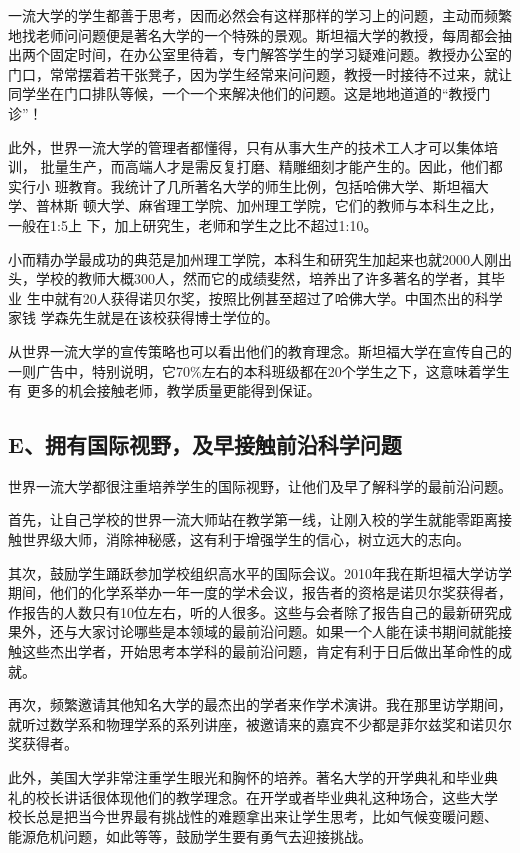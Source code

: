 \documentclass[11pt]{ctexart}
\begin{document}
{{{{一流大学的学生都善于思考，因而必然会有这样那样的学习上的问题，主动而频繁
地找老师问问题便是著名大学的一个特殊的景观。斯坦福大学的教授，每周都会抽
出两个固定时间，在办公室里待着，专门解答学生的学习疑难问题。教授办公室的
门口，常常摆着若干张凳子，因为学生经常来问问题，教授一时接待不过来，就让
同学坐在门口排队等候，一个一个来解决他们的问题。这是地地道道的“教授门
诊”！


此外，世界一流大学的管理者都懂得，只有从事大生产的技术工人才可以集体培训，
批量生产，而高端人才是需反复打磨、精雕细刻才能产生的。因此，他们都实行小
班教育。我统计了几所著名大学的师生比例，包括哈佛大学、斯坦福大学、普林斯
顿大学、麻省理工学院、加州理工学院，它们的教师与本科生之比，一般在1:5上
下，加上研究生，老师和学生之比不超过1:10。

小而精办学最成功的典范是加州理工学院，本科生和研究生加起来也就2000人刚出
头，学校的教师大概300人，然而它的成绩斐然，培养出了许多著名的学者，其毕业
生中就有20人获得诺贝尔奖，按照比例甚至超过了哈佛大学。中国杰出的科学家钱
学森先生就是在该校获得博士学位的。


从世界一流大学的宣传策略也可以看出他们的教育理念。斯坦福大学在宣传自己的
一则广告中，特别说明，它70\%左右的本科班级都在20个学生之下，这意味着学生有
更多的机会接触老师，教学质量更能得到保证。




\subsection{E、拥有国际视野，及早接触前沿科学问题}
\label{sec:orgb73374d}

世界一流大学都很注重培养学生的国际视野，让他们及早了解科学的最前沿问题。

首先，让自己学校的世界一流大师站在教学第一线，让刚入校的学生就能零距离接
触世界级大师，消除神秘感，这有利于增强学生的信心，树立远大的志向。


其次，鼓励学生踊跃参加学校组织高水平的国际会议。2010年我在斯坦福大学访学
期间，他们的化学系举办一年一度的学术会议，报告者的资格是诺贝尔奖获得者，
作报告的人数只有10位左右，听的人很多。这些与会者除了报告自己的最新研究成
果外，还与大家讨论哪些是本领域的最前沿问题。如果一个人能在读书期间就能接
触这些杰出学者，开始思考本学科的最前沿问题，肯定有利于日后做出革命性的成
就。


再次，频繁邀请其他知名大学的最杰出的学者来作学术演讲。我在那里访学期间，
就听过数学系和物理学系的系列讲座，被邀请来的嘉宾不少都是菲尔兹奖和诺贝尔
奖获得者。


此外，美国大学非常注重学生眼光和胸怀的培养。著名大学的开学典礼和毕业典
礼的校长讲话很体现他们的教学理念。在开学或者毕业典礼这种场合，这些大学
校长总是把当今世界最有挑战性的难题拿出来让学生思考，比如气候变暖问题、
能源危机问题，如此等等，鼓励学生要有勇气去迎接挑战。


}}}}
\end{document}

